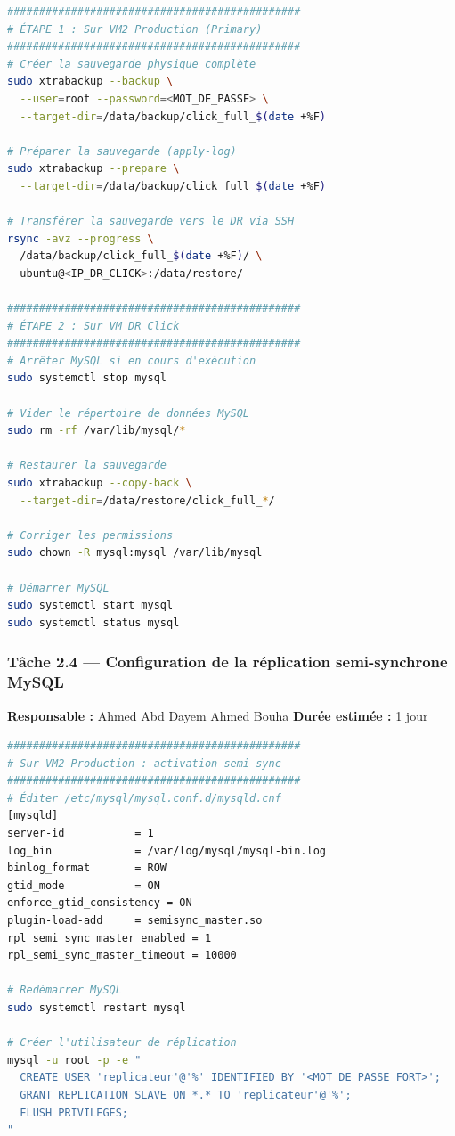 \documentclass[a4paper,11pt]{article}
\begin{document}
\begin{lstlisting}[language=bash, caption={Sauvegarde initiale sur le primaire Click et restauration en DR}]
##############################################
# ÉTAPE 1 : Sur VM2 Production (Primary)
##############################################
# Créer la sauvegarde physique complète
sudo xtrabackup --backup \
  --user=root --password=<MOT_DE_PASSE> \
  --target-dir=/data/backup/click_full_$(date +%F)

# Préparer la sauvegarde (apply-log)
sudo xtrabackup --prepare \
  --target-dir=/data/backup/click_full_$(date +%F)

# Transférer la sauvegarde vers le DR via SSH
rsync -avz --progress \
  /data/backup/click_full_$(date +%F)/ \
  ubuntu@<IP_DR_CLICK>:/data/restore/

##############################################
# ÉTAPE 2 : Sur VM DR Click
##############################################
# Arrêter MySQL si en cours d'exécution
sudo systemctl stop mysql

# Vider le répertoire de données MySQL
sudo rm -rf /var/lib/mysql/*

# Restaurer la sauvegarde
sudo xtrabackup --copy-back \
  --target-dir=/data/restore/click_full_*/

# Corriger les permissions
sudo chown -R mysql:mysql /var/lib/mysql

# Démarrer MySQL
sudo systemctl start mysql
sudo systemctl status mysql
\end{lstlisting}

\subsubsection{Tâche 2.4 — Configuration de la réplication semi-synchrone MySQL}

\textbf{Responsable :} Ahmed Abd Dayem Ahmed Bouha \quad \textbf{Durée estimée :} 1 jour

\begin{lstlisting}[language=bash, caption={Configuration réplication semi-synchrone sur VM2 Production (Primary)}]
##############################################
# Sur VM2 Production : activation semi-sync
##############################################
# Éditer /etc/mysql/mysql.conf.d/mysqld.cnf
[mysqld]
server-id           = 1
log_bin             = /var/log/mysql/mysql-bin.log
binlog_format       = ROW
gtid_mode           = ON
enforce_gtid_consistency = ON
plugin-load-add     = semisync_master.so
rpl_semi_sync_master_enabled = 1
rpl_semi_sync_master_timeout = 10000

# Redémarrer MySQL
sudo systemctl restart mysql

# Créer l'utilisateur de réplication
mysql -u root -p -e "
  CREATE USER 'replicateur'@'%' IDENTIFIED BY '<MOT_DE_PASSE_FORT>';
  GRANT REPLICATION SLAVE ON *.* TO 'replicateur'@'%';
  FLUSH PRIVILEGES;
"
\end{lstlisting}
\end{document}

